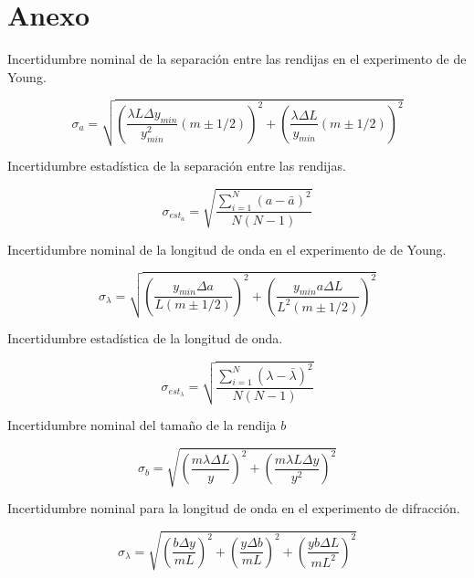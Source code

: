 \documentclass[article,12pt]{elsarticle}
\begin{document}
\section*{Anexo}

Incertidumbre nominal de la separación entre las rendijas en el experimento de de Young. 

\begin{mdframed}
    \label{incertidumbre P.A}
    \begin{equation}
        \sigma_{a}= \sqrt{\left(\frac{\lambda L\Delta y_{min}}{y_{min}^2}(m\pm 1/2)\right)^{2}+\left(\frac{\lambda\Delta L}{y_{min}}(m\pm 1/2)\right)^2}
    \end{equation}
\end{mdframed}

Incertidumbre estadística de la separación entre las rendijas.
\begin{mdframed}
 \label{incertidumbre PPP}
 \begin{equation}
\sigma_{est_a}=\sqrt{\frac{\sum_{i=1}^{N}(a-\bar{a})^2}{N(N-1)}}
\end{equation}
\end{mdframed}

Incertidumbre nominal de la longitud de onda en el experimento de de Young. 
\begin{mdframed}
    \label{incertidumbre P.A}
    \begin{equation}
        \sigma_{\lambda}= \sqrt{\left(\frac{y_{min} \Delta a}{L(m\pm 1/2)}\right)^{2}+\left(\frac{y_{min}a\Delta L}{L^2(m\pm 1/2)}\right)^2}
    \end{equation}
\end{mdframed}

Incertidumbre estadística de la longitud de onda.
\begin{mdframed}
 \label{incertidumbre PPP}
 \begin{equation}
\sigma_{est_\lambda}=\sqrt{\frac{\sum_{i=1}^{N}(\lambda-\bar{\lambda})^2}{N(N-1)}}
\end{equation}
\end{mdframed}

Incertidumbre nominal del tamaño de la rendija $b$
\begin{mdframed}
    \label{incertidumbre P.A}
    \begin{equation}
        \sigma_b= \sqrt{\left(\frac{m\lambda \Delta L}{y}\right)^{2}+\left(\frac{m\lambda L\Delta y}{y^2}\right)^2}
    \end{equation}
\end{mdframed}

Incertidumbre nominal para la longitud de onda en el experimento de difracción.
\begin{mdframed}
    \label{incertidumbre P.A}
    \begin{equation}
        \sigma_\lambda= \sqrt{\left(\frac{b \Delta y}{mL}\right)^{2}+\left(\frac{y\Delta b}{mL}\right)^2+\left(\frac{yb\Delta L}{mL^2}\right)^2}
    \end{equation}
\end{mdframed}
\end{document}
